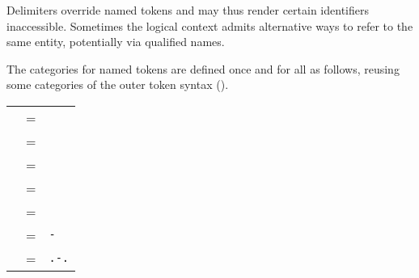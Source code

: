 \begin{isabellebody}
\begin{isamarkuptext}
  Delimiters override named tokens and may thus render certain
  identifiers inaccessible.  Sometimes the logical context admits
  alternative ways to refer to the same entity, potentially via
  qualified names.

  \medskip The categories for named tokens are defined once and for
  all as follows, reusing some categories of the outer token syntax
  ().

  \begin{center}
  \begin{supertabular}{rcl}
    \hypertarget{syntax.inner.id}{\hyperlink{syntax.inner.id}{\mbox{}}} & = & \hyperlink{syntax.ident}{\mbox{}} \\
    \hypertarget{syntax.inner.longid}{\hyperlink{syntax.inner.longid}{\mbox{}}} & = & \hyperlink{syntax.longident}{\mbox{}} \\
    \hypertarget{syntax.inner.var}{\hyperlink{syntax.inner.var}{\mbox{}}} & = & \hyperlink{syntax.var}{\mbox{}} \\
    \hypertarget{syntax.inner.tid}{\hyperlink{syntax.inner.tid}{\mbox{}}} & = & \hyperlink{syntax.typefree}{\mbox{}} \\
    \hypertarget{syntax.inner.tvar}{\hyperlink{syntax.inner.tvar}{\mbox{}}} & = & \hyperlink{syntax.typevar}{\mbox{}} \\
    \hypertarget{syntax.inner.num-token}{\hyperlink{syntax.inner.num-token}{\mbox{}}} & = & \hyperlink{syntax.nat}{\mbox{}}\verb|-|\hyperlink{syntax.nat}{\mbox{}} \\
    \hypertarget{syntax.inner.float-token}{\hyperlink{syntax.inner.float-token}{\mbox{}}} & = & \hyperlink{syntax.nat}{\mbox{}}\verb|.|\hyperlink{syntax.nat}{\mbox{}}\verb|-|\hyperlink{syntax.nat}{\mbox{}}\verb|.|\hyperlink{syntax.nat}{\mbox{}} \\

\end{supertabular}
\end{center}
\end{isamarkuptext}
\end{isabellebody}

